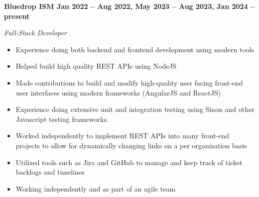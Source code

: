 \vspace{0.1cm}
\textbf{Bluedrop ISM \hfill Jan 2022 -- Aug 2022, May 2023 -- Aug 2023, Jan 2024 -- present} \par
\textit{Full-Stack Developer} \par
\begin{itemize}
	\item Experience doing both backend and frontend development using modern tools
    \item Helped build high quality REST APIs using NodeJS
    \item Made contributions to build and modify high-quality user facing front-end user interfaces using modern frameworks (AngularJS and ReactJS)
    \item Experience doing extensive unit and integration testing using Sinon and other Javascript testing frameworks.
    \item Worked independently to implement REST APIs into many front-end projects to allow for dynamically changing links on a per organization basis
    \item Utilized tools such as Jira and GitHub to manage and keep track of ticket backlogs and timelines
    \item Working independently and as part of an agile team
\end{itemize} \par